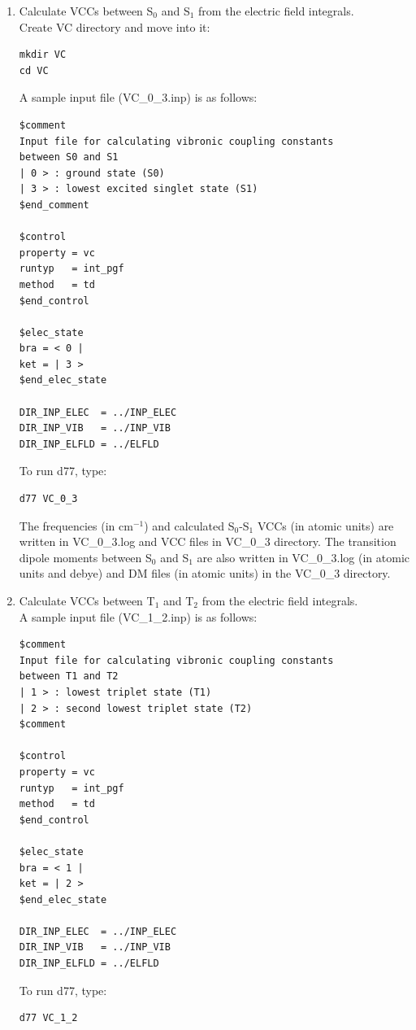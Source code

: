 ﻿\documentclass[11pt,a4paper,openany]{article}
\begin{document}
\begin{enumerate}
{\begin{verbatim}
$control
property = vc
runtyp   = calc_int_cgf
$end_control

DIR_INP_ELEC = INP_ELEC
\end{verbatim}
To run d77, type:
\begin{verbatim} 
d77 ELFLD
\end{verbatim}
d77 reads information on the nuclear coordinates and atomic orbitals from \\
INP\_ELEC directory, calculates the electric field integrals, and writes them to a file (ELFLD\_CGF\_ATM) in the ELFLD directory. 
Note that ELFLD\_CGF\_ATM takes up large amounts of disk space (sometimes larger than 10 GB) for large molecules. 
A sample ELFLD\_CGF\_ATM file is in the examples/C2H4/ELFLD directory.
}

\item{
Calculate VCCs between S$_0$ and S$_1$ from the electric field integrals.\\
Create VC directory and move into it:
\begin{verbatim}
mkdir VC
cd VC
\end{verbatim} 
A sample input file (VC\_0\_3.inp) is as follows:
\begin{verbatim} 
$comment
Input file for calculating vibronic coupling constants
between S0 and S1
| 0 > : ground state (S0)
| 3 > : lowest excited singlet state (S1)
$end_comment

$control
property = vc
runtyp   = int_pgf
method   = td
$end_control

$elec_state
bra = < 0 |
ket = | 3 >
$end_elec_state

DIR_INP_ELEC  = ../INP_ELEC
DIR_INP_VIB   = ../INP_VIB
DIR_INP_ELFLD = ../ELFLD
\end{verbatim}
To run d77, type:
\begin{verbatim} 
d77 VC_0_3
\end{verbatim}
The frequencies (in cm$^{-1}$) and calculated S$_0$-S$_1$ VCCs (in atomic units) are written in VC\_0\_3.log and VCC files in VC\_0\_3 directory. The transition dipole moments between S$_0$ and S$_1$ are also written in VC\_0\_3.log (in atomic units and debye) and DM files (in atomic units) in the VC\_0\_3 directory.}

\item{
Calculate VCCs between T$_1$ and T$_2$ from the electric field integrals.\\
A sample input file (VC\_1\_2.inp) is as follows:
\begin{verbatim} 
$comment
Input file for calculating vibronic coupling constants
between T1 and T2
| 1 > : lowest triplet state (T1)
| 2 > : second lowest triplet state (T2)
$comment

$control
property = vc
runtyp   = int_pgf
method   = td
$end_control

$elec_state
bra = < 1 |
ket = | 2 >
$end_elec_state

DIR_INP_ELEC  = ../INP_ELEC
DIR_INP_VIB   = ../INP_VIB
DIR_INP_ELFLD = ../ELFLD
\end{verbatim}
To run d77, type:
\begin{verbatim} 
d77 VC_1_2
\end{verbatim}
}
\end{enumerate}
\end{document}
